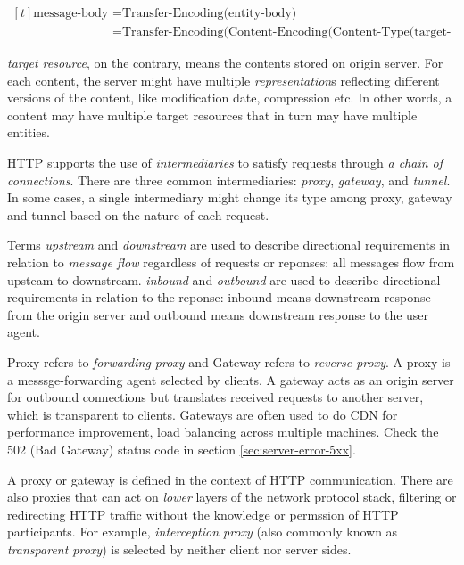 \begin{equation}
  \label{eq:message-body}
  \begin{aligned}[t]
    \text{message-body} &= \text{Transfer-Encoding(entity-body)} \\
                        &= \text{Transfer-Encoding(Content-Encoding(Content-Type(target-resource)))}
  \end{aligned}
\end{equation}

\textit{target resource}, on the contrary, means the contents
stored on origin server. For each content, the server might have
multiple \textit{representation}s reflecting different versions of
the content, like modification date, compression etc. In other
words, a content may have multiple target resources that in turn
may have multiple entities.

HTTP supports the use of \textit{intermediaries} to satisfy
requests through \textit{a chain of connections}. There are three
common intermediaries: \textit{proxy}, \textit{gateway}, and
\textit{tunnel}. In some cases, a single intermediary might change
its type among proxy, gateway and tunnel based on the nature of
each request.

Terms \textit{upstream} and \textit{downstream} are used to
describe directional requirements in relation to \textit{message
  flow} regardless of requests or reponses: all messages flow from
upsteam to downstream. \textit{inbound} and \textit{outbound} are
used to describe directional requirements in relation to the
reponse: inbound means downstream response from the origin server
and outbound means downstream response to the user agent.

Proxy refers to \textit{forwarding proxy} and Gateway refers to
\textit{reverse proxy}. A proxy is a messsge-forwarding agent
selected by clients. A gateway acts as an origin server for
outbound connections but translates received requests to another
server, which is transparent to clients. Gateways are often used
to do CDN for performance improvement, load balancing across
multiple machines. Check the 502 (Bad Gateway) status code in
section \ref{sec:server-error-5xx}.

A proxy or gateway is defined in the context of HTTP
communication. There are also proxies that can act on
\textit{lower} layers of the network protocol stack, filtering or
redirecting HTTP traffic without the knowledge or permssion of
HTTP participants. For example, \textit{interception proxy} (also
commonly known as \textit{transparent proxy}) is selected by
neither client nor server sides.

